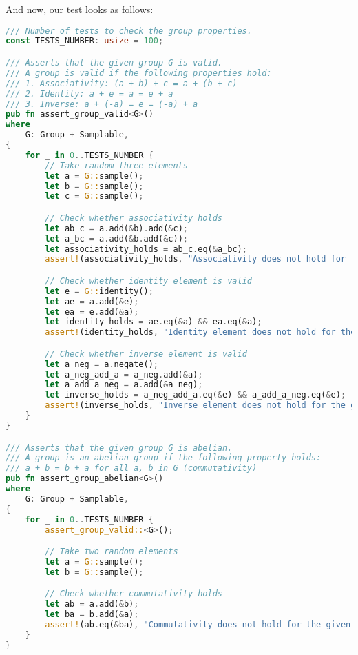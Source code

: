 \documentclass[../lecture-notes-148x210.tex]{subfiles}
\begin{document}
And now, our test looks as follows:
\begin{lstlisting}[language=Rust]
/// Number of tests to check the group properties.
const TESTS_NUMBER: usize = 100;

/// Asserts that the given group G is valid.
/// A group is valid if the following properties hold:
/// 1. Associativity: (a + b) + c = a + (b + c)
/// 2. Identity: a + e = a = e + a
/// 3. Inverse: a + (-a) = e = (-a) + a
pub fn assert_group_valid<G>()
where
    G: Group + Samplable,
{
    for _ in 0..TESTS_NUMBER {
        // Take random three elements
        let a = G::sample();
        let b = G::sample();
        let c = G::sample();

        // Check whether associativity holds
        let ab_c = a.add(&b).add(&c);
        let a_bc = a.add(&b.add(&c));
        let associativity_holds = ab_c.eq(&a_bc);
        assert!(associativity_holds, "Associativity does not hold for the given group");

        // Check whether identity element is valid
        let e = G::identity();
        let ae = a.add(&e);
        let ea = e.add(&a);
        let identity_holds = ae.eq(&a) && ea.eq(&a);
        assert!(identity_holds, "Identity element does not hold for the given group");

        // Check whether inverse element is valid
        let a_neg = a.negate();
        let a_neg_add_a = a_neg.add(&a);
        let a_add_a_neg = a.add(&a_neg);
        let inverse_holds = a_neg_add_a.eq(&e) && a_add_a_neg.eq(&e);
        assert!(inverse_holds, "Inverse element does not hold for the given group");
    }
}

/// Asserts that the given group G is abelian.
/// A group is an abelian group if the following property holds:
/// a + b = b + a for all a, b in G (commutativity)
pub fn assert_group_abelian<G>()
where
    G: Group + Samplable,
{
    for _ in 0..TESTS_NUMBER {
        assert_group_valid::<G>();

        // Take two random elements
        let a = G::sample();
        let b = G::sample();

        // Check whether commutativity holds
        let ab = a.add(&b);
        let ba = b.add(&a);
        assert!(ab.eq(&ba), "Commutativity does not hold for the given group");
    }
}    
\end{lstlisting}
\end{document}
